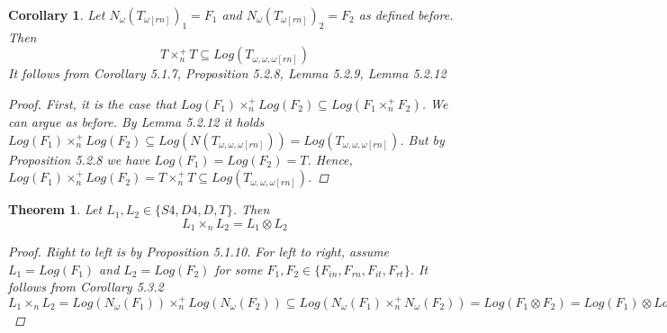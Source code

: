 \documentclass[12pt, a4paper]{scrartcl}
\newtheorem{corollary}[definition]{Corollary}
\newtheorem{theorem}[definition]{Theorem}
\begin{document}
    \begin{corollary}
        Let $N_\omega(T_{\omega[rn]})_1 = F_1$ and $N_\omega(T_{\omega[rn]})_2 = F_2$ as defined before. Then 
        $$T \times^+_n T \subseteq Log(T_{\omega,\omega,\omega[rn]})$$
        It follows from Corollary 5.1.7, Proposition 5.2.8, Lemma 5.2.9, Lemma 5.2.12

        \begin{proof}
            First, it is the case that $Log(F_1) \times^+_n Log(F_2) \subseteq Log(F_1 \times^+_n F_2)$. We can argue as before.
            By Lemma 5.2.12 it holds $Log(F_1) \times^+_n Log(F_2) \subseteq Log(N(T_{\omega,\omega,\omega[rn]})) = Log(T_{\omega,\omega,\omega[rn]})$.
            But by Proposition 5.2.8 we have $Log(F_1) = Log(F_2) = T$. Hence, $Log(F_1) \times^+_n Log(F_2) = T \times^+_n T \subseteq Log(T_{\omega,\omega,\omega[rn]})$.
        \end{proof}

    \end{corollary}

    \begin{theorem}
        Let $L_1, L_2 \in \{S4, D4, D, T\}$. Then 
        $$L_1 \times_n L_2 = L_1 \otimes L_2$$

        \begin{proof}
            Right to left is by Proposition 5.1.10. \newline
            For left to right, assume $L_1 = Log(F_1)$ and $L_2 = Log(F_2)$ for some $F_1, F_2 \in \{F_{in}, F_{rn}, F_{it}, F_{rt}\}$.
            It follows from Corollary 5.3.2 \newline
            $L_1 \times_n L_2 = Log(N_\omega(F_1)) \times^+_n Log(N_\omega(F_2)) \subseteq Log(N_\omega(F_1) \times^+_n N_\omega(F_2)) = Log(F_1 \otimes F_2) = Log(F_1) \otimes Log(F_2) = L_1 \otimes L_2$
        \end{proof}
    \end{theorem}
\end{document}
